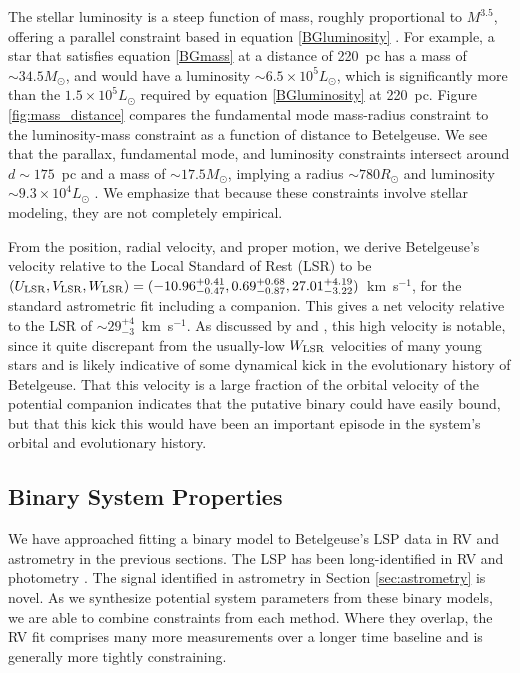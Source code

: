 \documentclass[twocolumn]{aastex631}
\begin{document}
The stellar luminosity is a steep function of mass, roughly proportional to $M^{3.5}$, offering a parallel constraint based in equation \eqref{BGluminosity} \citep[e.g.][]{2023arXiv230614232C}. For example, a star that satisfies equation \eqref{BGmass} at a distance of 220~pc has a mass of $\sim 34.5M_\odot$, and would have a luminosity $\sim 6.5\times 10^5 L_\odot$, which is significantly more than the $1.5\times 10^5 L_\odot$ required by equation \eqref{BGluminosity} at 220~pc. Figure \ref{fig:mass_distance} compares the fundamental mode mass-radius constraint to the luminosity-mass constraint as a function of distance to Betelgeuse. We see that the parallax, fundamental mode, and luminosity constraints intersect around $d \sim 175$~pc and a mass of $\sim 17.5 M_\odot$, implying a radius $\sim 780R_\odot$ and luminosity $\sim 9.3 \times 10^4 L_\odot$ \citep[much as derived by][]{2020ApJ...902...63J}. We emphasize that because these constraints involve stellar modeling, they  are not completely empirical. 


From the position, radial velocity, and proper motion, we derive Betelgeuse's velocity relative to the Local Standard of Rest (LSR) to be $(U_{\rm LSR},V_{\rm LSR},W_{\rm LSR}) = (-10.96^{+0.41}_{-0.47}, 0.69^{+0.68}_{-0.87}, 27.01^{+4.19}_{-3.22})$~km~s$^{-1}$, for the standard astrometric fit including a companion. This gives a net velocity relative to the LSR of $\sim 29_{-3}^{+4}$~km~s$^{-1}$. As discussed by \citet{2020ApJ...902...63J} and \citet{2023A&G....64.3.11W}, this high velocity is notable, since it quite discrepant from the usually-low $W_{\rm LSR}$ velocities of many young stars and is likely indicative of some dynamical kick in the evolutionary history of Betelgeuse. That this velocity is a large fraction of the orbital velocity of the potential companion indicates that the putative binary could have easily  bound, but that this kick this would have been an important episode in the system's orbital and evolutionary history. 




\subsection{Binary System Properties}

We have approached fitting a binary model to Betelgeuse's LSP data in RV and astrometry in the previous sections. The LSP has been long-identified in RV \citep{1908PASP...20..227P,1910LicOB...6...17C,1911LicOB...6..154C,1928MNRAS..88..660S,1984PASP...96..366G} and photometry \citep{1869ABSBo...7..315A,1911MNRAS..71..701B,1913PA.....21....5S,1913AN....194...81O,1928PWasO..15..177S}. The signal identified in astrometry in Section \ref{sec:astrometry} is novel. As we synthesize potential system parameters from these binary models, we are able to combine constraints from each method. Where they overlap, the RV fit comprises many more measurements over a longer time baseline and is generally more tightly constraining. 
\end{document}
